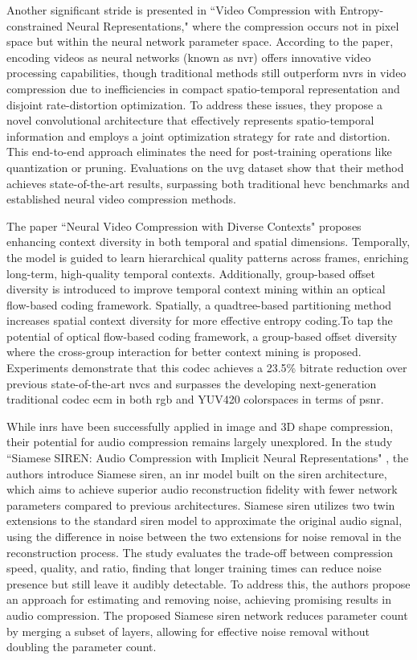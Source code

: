 \documentclass{ioereport}
\begin{document}
Another significant stride is presented in ``Video Compression with Entropy-constrained Neural Representations," \cite{Gomes_2023_CVPR} where the compression occurs not in pixel space but within the neural network parameter space. According to the paper, encoding videos as neural networks (known as \gls{nvr}) offers innovative video processing capabilities, though traditional methods still outperform \gls{nvr}s in video compression due to inefficiencies in compact spatio-temporal representation and disjoint rate-distortion optimization. To address these issues, they propose a novel convolutional architecture that effectively represents spatio-temporal information and employs a joint optimization strategy for rate and distortion. This end-to-end approach eliminates the need for post-training operations like quantization or pruning. Evaluations on the \gls{uvg} dataset show that their method achieves state-of-the-art results, surpassing both traditional \gls{hevc} benchmarks and established neural video compression methods. 

The paper ``Neural Video Compression with Diverse Contexts" \cite{li2023neural} proposes enhancing context diversity in both temporal and spatial dimensions. Temporally, the model is guided to learn hierarchical quality patterns across frames, enriching long-term, high-quality temporal contexts. Additionally, group-based offset diversity is introduced to improve temporal context mining within an optical flow-based coding framework. Spatially, a quadtree-based partitioning method increases spatial context diversity for more effective entropy coding.To tap the potential of optical flow-based coding framework, a group-based offset diversity where the cross-group interaction for better context mining is proposed. Experiments demonstrate that this \gls{codec} achieves a 23.5\% bitrate reduction over previous state-of-the-art \gls{nvc}s and surpasses the developing next-generation traditional \gls{codec} \gls{ecm} in both \gls{rgb} and YUV420 colorspaces in terms of \gls{psnr}. 

While \gls{inr}s have been successfully applied in image and 3D shape compression, their potential for audio compression remains largely unexplored. In the study ``Siamese SIREN: Audio Compression with Implicit Neural Representations" \cite{lanzendörfer2023siamese}, the authors introduce Siamese \gls{siren}, an \gls{inr} model built on the \gls{siren} architecture, which aims to achieve superior audio reconstruction fidelity with fewer network parameters compared to previous architectures. Siamese \gls{siren} utilizes two twin extensions to the standard \gls{siren} model to approximate the original audio signal, using the difference in noise between the two extensions for noise removal in the reconstruction process. The study evaluates the trade-off between compression speed, quality, and ratio, finding that longer training times can reduce noise presence but still leave it audibly detectable. To address this, the authors propose an approach for estimating and removing noise, achieving promising results in audio compression. The proposed Siamese \gls{siren} network reduces parameter count by merging a subset of layers, allowing for effective noise removal without doubling the parameter count.
\end{document}
